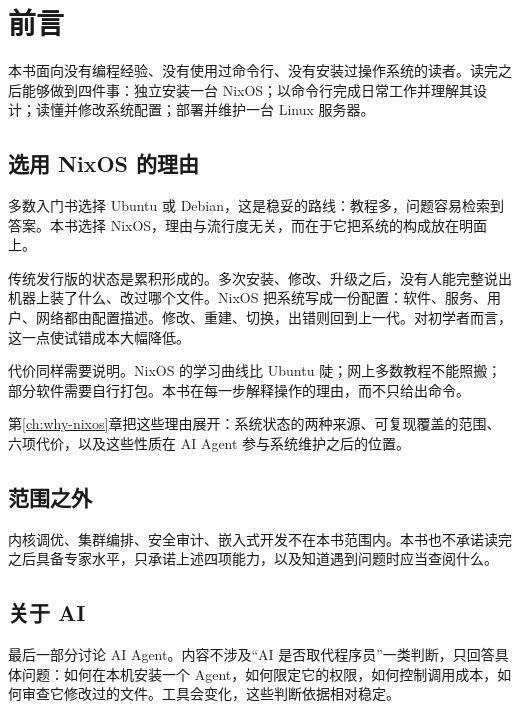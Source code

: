 \chapter*{前言}

本书面向没有编程经验、没有使用过命令行、没有安装过操作系统的读者。读完之后能够做到四件事：独立安装一台 NixOS；以命令行完成日常工作并理解其设计；读懂并修改系统配置；部署并维护一台 Linux 服务器。

\section*{选用 NixOS 的理由}

多数入门书选择 Ubuntu 或 Debian，这是稳妥的路线：教程多，问题容易检索到答案。本书选择 NixOS，理由与流行度无关，而在于它把系统的构成放在明面上。

传统发行版的状态是累积形成的。多次安装、修改、升级之后，没有人能完整说出机器上装了什么、改过哪个文件。NixOS 把系统写成一份配置：软件、服务、用户、网络都由配置描述。修改、重建、切换，出错则回到上一代。对初学者而言，这一点使试错成本大幅降低。

代价同样需要说明。NixOS 的学习曲线比 Ubuntu 陡；网上多数教程不能照搬；部分软件需要自行打包。本书在每一步解释操作的理由，而不只给出命令。

第\ref{ch:why-nixos}章把这些理由展开：系统状态的两种来源、可复现覆盖的范围、六项代价，以及这些性质在 AI Agent 参与系统维护之后的位置。

\section*{范围之外}

内核调优、集群编排、安全审计、嵌入式开发不在本书范围内。本书也不承诺读完之后具备专家水平，只承诺上述四项能力，以及知道遇到问题时应当查阅什么。

\section*{关于 AI}

最后一部分讨论 AI Agent。内容不涉及“AI 是否取代程序员”一类判断，只回答具体问题：如何在本机安装一个 Agent，如何限定它的权限，如何控制调用成本，如何审查它修改过的文件。工具会变化，这些判断依据相对稳定。

\ifbknarrow
  \par\vspace{6pt}\noindent\bookauthor\quad\bookdate
\else
  \vspace{12pt}
  \begin{flushright}
  \bookauthor\\
  \bookdate
  \end{flushright}
\fi
